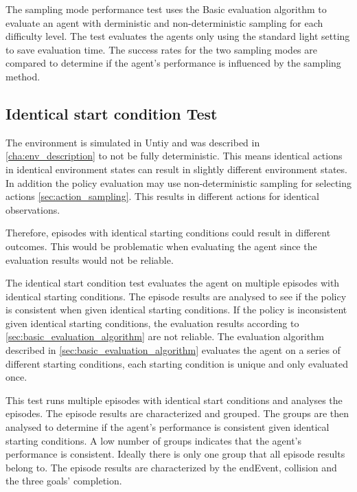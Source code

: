 The sampling mode performance test uses the Basic evaluation algorithm to evaluate an agent with derministic and non-deterministic sampling for each difficulty level. The test evaluates the agents only using the standard light setting to save evaluation time. The success rates for the two sampling modes are compared to determine if the agent's performance is influenced by the sampling method.






\subsection{Identical start condition Test}

The environment is simulated in Untiy and was described in \ref{cha:env_description} to not be fully deterministic. This means identical actions in identical environment states can result in slightly different environment states. In addition the policy evaluation may use non-deterministic sampling for selecting actions \ref{sec:action_sampling}. This results in different actions for identical observations. 

Therefore, episodes with identical starting conditions could result in different outcomes. This would be problematic when evaluating the agent since the evaluation results would not be reliable.

The identical start condition test evaluates the agent on multiple episodes with identical starting conditions. The episode results are analysed to see if the policy is consistent when given identical starting conditions. If the policy is inconsistent given identical starting conditions, the evaluation results according to \ref{sec:basic_evaluation_algorithm} are not reliable. The evaluation algorithm described in \ref{sec:basic_evaluation_algorithm} evaluates the agent on a series of different starting conditions, each starting condition is unique and only evaluated once.

This test runs multiple episodes with identical start conditions and analyses the episodes. The episode results are characterized and grouped. The groups are then analysed to determine if the agent's performance is consistent given identical starting conditions. A low number of groups indicates that the agent's performance is consistent. Ideally there is only one group that all episode results belong to.
The episode results are characterized by the endEvent, collision and the three goals' completion.


